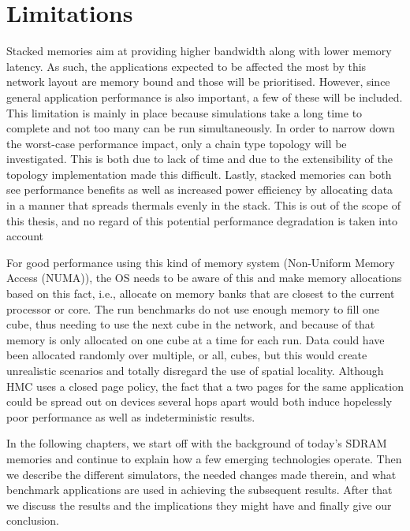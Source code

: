 \section{Limitations}
Stacked memories aim at providing higher bandwidth along with lower memory latency. As such, the applications expected to be affected the most by this network layout are memory bound and those will be prioritised. However, since general application performance is also important, a few of these will be included. This limitation is mainly in place because simulations take a long time to complete and not too many can be run simultaneously.  In order to narrow down the worst-case performance impact, only a chain type topology will be investigated. This is both due to lack of time and due to the extensibility of the topology implementation made this difficult. Lastly, stacked memories can both see performance benefits as well as increased power efficiency by allocating data in a manner that spreads thermals evenly in the stack. This is out of the scope of this thesis, and no regard of this potential performance degradation is taken into account
\bigskip

For good performance using this kind of memory system (Non-Uniform Memory Access (NUMA)), the OS needs to be aware of this and make memory allocations based on this fact, i.e., allocate on memory banks that are closest to the current processor or core. The run benchmarks do not use enough memory to fill one cube, thus needing to use the next cube in the network, and because of that memory is only allocated on one cube at a time for each run. Data could have been allocated randomly over multiple, or all, cubes, but this would create unrealistic scenarios and totally disregard the use of spatial locality. Although HMC uses a closed page policy, the fact that a two pages for the same application could be spread out on devices several hops apart would both induce hopelessly poor performance as well as indeterministic results.
\bigskip

In the following chapters, we start off with the background of today's SDRAM memories and continue to explain how a few emerging technologies operate. Then we describe the different simulators, the needed changes made therein, and what benchmark applications are used in achieving the subsequent results. After that we discuss the results and the implications they might have and finally give our conclusion. 